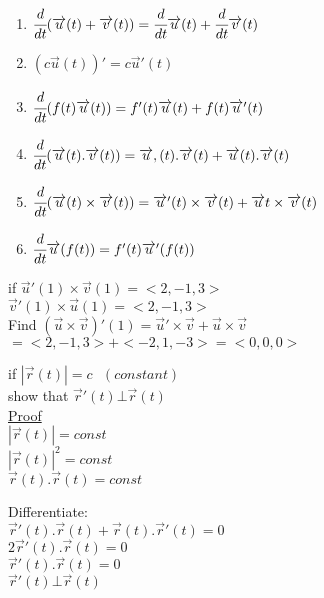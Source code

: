 \begin{enumerate}
    \item $\cfrac{d}{dt}(\overrightarrow{u}(t)+\overrightarrow{v}(t))=\cfrac{d}{dt}\overrightarrow{u}(t)+\cfrac{d}{dt}\overrightarrow{v}(t)$
    \item $(c\overrightarrow{u}(t))'=c\overrightarrow{u}'(t)$
    \item $\cfrac{d}{dt}(f(t)\overrightarrow{u}(t))=f'(t)\overrightarrow{u}(t)+f(t)\overrightarrow{u}'(t)$
    \item $\cfrac{d}{dt}(\overrightarrow{u}(t).\overrightarrow{v}(t))=\overrightarrow{u},(t).\overrightarrow{v}(t)+\overrightarrow{u}(t).\overrightarrow{v}(t)$
    \item $\cfrac{d}{dt}(\overrightarrow{u}(t)\times\overrightarrow{v}(t))=\overrightarrow{u}'(t)\times\overrightarrow{v}(t)+\overrightarrow{u}t\times\overrightarrow{v}(t)$
    \item $\cfrac{d}{dt}\overrightarrow{u}(f(t))=f'(t)\overrightarrow{u}'(f(t))$
\end{enumerate}
\noindent{\color{smalt(darkpowderblue)}\rule{\linewidth}{.2mm}}
\begin{example}
if $\overrightarrow{u}'(1)\times\overrightarrow{v}(1)=<2,-1,3>$\\
$\overrightarrow{v}'(1)\times\overrightarrow{u}(1)=<2,-1,3>$\\
Find $(\overrightarrow{u}\times\overrightarrow{v})'(1)=\overrightarrow{u}'\times\overrightarrow{v}+\overrightarrow{u}\times\overrightarrow{v}$\\
$=<2,-1,3>+<-2,1,-3>=<0,0,0>$
\end{example}
\noindent{\color{smalt(darkpowderblue)}\rule{\linewidth}{.2mm}}
\begin{example}
if $|\overrightarrow{r}(t)|=c~~~(constant)$\\
show that $\overrightarrow{r}'(t)\bot\overrightarrow{r}(t)$\\
\underline{\textbf{\large}\color{smalt(darkpowderblue)}Proof}\\
$|\overrightarrow{r}(t)|=const$\\
$|\overrightarrow{r}(t)|^2=const$\\
$\overrightarrow{r}(t).\overrightarrow{r}(t)=const$
\end{example}
\noindent{\color{smalt(darkpowderblue)}\rule{\linewidth}{.2mm}}
Differentiate:\\
$\overrightarrow{r}'(t).\overrightarrow{r}(t)+\overrightarrow{r}(t).\overrightarrow{r}'(t)=0$\\
$2\overrightarrow{r}'(t).\overrightarrow{r}(t)=0$\\
$\overrightarrow{r}'(t).\overrightarrow{r}(t)=0$\\
$\overrightarrow{r}'(t)\bot \overrightarrow{r}(t)$